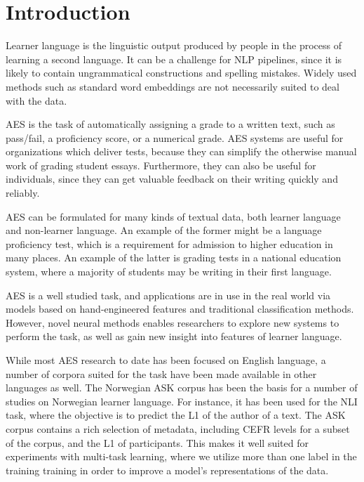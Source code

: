 \chapter{Introduction}

\acresetall

Learner language is the linguistic output produced by people in the process
of learning a second language. It can be a challenge for \ac{NLP} pipelines,
since it is likely to contain ungrammatical constructions and spelling
mistakes. Widely used methods such as standard word embeddings are not
necessarily suited to deal with the data. 

\ac{AES} is the task of automatically assigning a grade to a written text,
such as pass/fail, a proficiency score, or a numerical grade. \ac{AES}
systems are useful for organizations which deliver tests, because they can
simplify the otherwise manual work of grading student essays. Furthermore,
they can also be useful for individuals, since they can get valuable feedback
on their writing quickly and reliably.

\ac{AES} can be formulated for many kinds of textual data, both learner
language and non-learner language. An example of the former might be a
language proficiency test, which is a requirement for admission to higher
education in many places. An example of the latter is grading tests in a
national education system, where a majority of students may be writing in
their first language.

\ac{AES} is a well studied task, and applications are in use in the real
world via models based on hand-engineered features and traditional
classification methods. However, novel neural methods enables researchers to
explore new systems to perform the task, as well as gain new insight into
features of learner language.

While most \ac{AES} research to date has been focused on English language, a
number of corpora suited for the task have been made available in other
languages as well. The Norwegian ASK corpus has been the basis for a number
of studies on Norwegian learner language. For instance, it has been used for
the \ac{NLI} task, where the objective is to predict the \ac{L1} of the
author of a text. The ASK corpus contains a rich selection of metadata,
including CEFR levels for a subset of the corpus, and the \ac{L1} of
participants. This makes it well suited for experiments with multi-task
learning, where we utilize more than one label in the training training in
order to improve a model's representations of the data.

